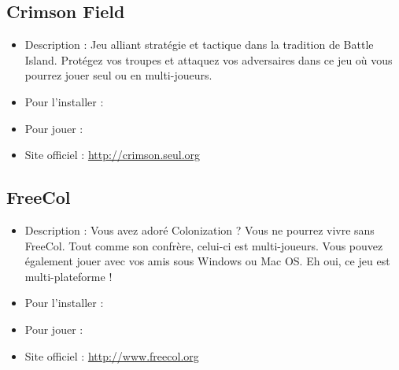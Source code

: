 \subsection{Crimson Field}
\begin{itemize}
\begingroup
{}
\item Description : Jeu alliant stratégie et tactique dans la tradition de Battle Island. Protégez vos troupes et attaquez vos adversaires dans ce jeu où vous pourrez jouer seul ou en multi-joueurs.{\par}
\item Pour l'installer : 
\item Pour jouer : 
\item Site officiel : \url{http://crimson.seul.org}{\par}
\endgroup
\end{itemize}
\subsection{FreeCol}
\begin{itemize}
\begingroup
{}
\item Description : Vous avez adoré Colonization ? Vous ne pourrez vivre sans FreeCol. Tout comme son confrère, celui-ci est multi-joueurs. Vous pouvez également jouer avec vos amis sous Windows ou Mac OS. Eh oui, ce jeu est multi-plateforme !{\par}
\item Pour l'installer : 
\item Pour jouer : 
\item Site officiel : \url{http://www.freecol.org}{\par}
\endgroup
\end{itemize}
